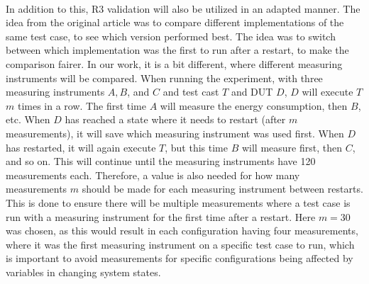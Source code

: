 \paragraph*{}
In addition to this, R3 validation\cite[]{Bokhari2020r3} will also be utilized in an adapted manner. The idea from the original article was to compare different implementations of the same test case, to see which version performed best. The idea was to switch between which implementation was the first to run after a restart, to make the comparison fairer. In our work, it is a bit different, where different measuring instruments will be compared. When running the experiment, with three measuring instruments $A, B$, and $C$ and test cast $T$ and DUT $D$, $D$ will execute $T$ $m$ times in a row. The first time $A$ will measure the energy consumption, then $B$, etc. When $D$ has reached a state where it needs to restart (after $m$ measurements), it will save which measuring instrument was used first. When $D$ has restarted, it will again execute $T$, but this time $B$ will measure first, then $C$, and so on. This will continue until the measuring instruments have 120 measurements each. Therefore, a value is also needed for how many measurements $m$ should be made for each measuring instrument between restarts. This is done to ensure there will be multiple measurements where a test case is run with a measuring instrument for the first time after a restart. Here $m=30$ was chosen, as this would result in each configuration having four measurements, where it was the first measuring instrument on a specific test case to run, which is important to avoid measurements for specific configurations being affected by variables in changing system states.
